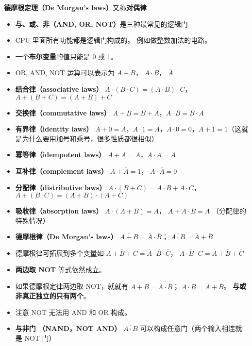 
\begin{issues}
\issueDraft
\end{issues}

\textbf{德摩根定理（De Morgan's laws）}又称\textbf{对偶律}

\begin{itemize}
\item \textbf{与、或、非（AND, OR, NOT）}是三种最常见的逻辑门
\item CPU 里面所有功能都是逻辑门构成的。 例如做整数加法的电路。
\item 一个\textbf{布尔变量}的值只能是 0 或 1。
\item OR, AND, NOT 运算可以表示为 $A + B$， $A\cdot B$， $\overline A$
\item \textbf{结合律（associative laws）} $A\cdot(B\cdot C) = (A\cdot B)\cdot C$， $A+(B+C)=(A+B)+C$
\item \textbf{交换律（commutative laws）} $A+B=B+A$，$A\cdot B=B\cdot A$
\item \textbf{有界律（identity laws）} $A+0=A$，$A\cdot 1=A$，$A\cdot 0 = 0$，$A+1=1$（这就是为什么要用加号和乘号，很多性质都很相似）
\item \textbf{幂等律（idempotent laws）} $A+A=A$，$A\cdot A=A$
\item \textbf{互补律（complement laws）} $A+\overline A = 1$， $A\cdot \overline A = 0$
\item \textbf{分配律（distributive laws）} $A\cdot(B+C)=A\cdot B+A\cdot C$， $A+(B\cdot C) = (A+B)\cdot(A+C)$
\item \textbf{吸收律（absorption laws）} $A\cdot(A+B) = A$， $A+A\cdot B = A$ （分配律的特殊情况）
\item \textbf{德摩根律（De Morgan's laws）} $\overline{A+B} = \overline A \cdot \overline B$； $\overline{A \cdot B} = \overline A + \overline B$
\item 德摩根律可拓展到多个变量如 $\overline{A+B+C} = \overline A \cdot \overline B \cdot \overline C$， $\overline{A \cdot B\cdot C} = \overline A + \overline B + \overline C$
\item \textbf{两边取 NOT} 等式依然成立。
\item 如果德摩根定律两边取 NOT，就就有 $A+B = \overline{\overline A \cdot \overline B}$； $A \cdot B = \overline{\overline A + \overline B}$。 \textbf{与或非真正独立的只有两个}。
\item 注意 NOT 无法用 AND 和 OR 构成。
\item \textbf{与非门 （NAND，NOT AND）} $\overline{A\cdot B}$ 可以构成任意门（两个输入相连就是 NOT 门）

\end{itemize}
